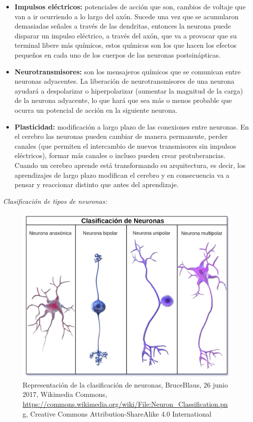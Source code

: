 \begin{itemize}
\item \textbf{Impulsos eléctricos:} potenciales de acción que son, cambios de voltaje que van a ir ocurriendo a lo largo del axón. Sucede una vez que se acumularon demasiadas señales a través de las dendritas, entonces la neurona puede disparar un impulso eléctrico, a través del axón, que va a provocar que su terminal libere más químicos, estos químicos son los que hacen los efectos pequeños en cada uno de los cuerpos de las neuronas postsinápticas.

\item \textbf{Neurotransmisores:} son los mensajeros químicos que se comunican entre neuronas adyacentes. La liberación de neurotransmisores de una neurona ayudará a despolarizar o hiperpolarizar (aumentar la magnitud de la carga) de la neurona adyacente, lo que hará que sea más o menos probable que ocurra un potencial de acción en la siguiente neurona.
 
\item \textbf{Plasticidad:} modificación a largo plazo de las conexiones entre neuronas. En el cerebro las neuronas pueden cambiar de manera permanente, perder canales (que permiten el intercambio de nuevos transmisores sin impulsos eléctricos), formar más canales o incluso pueden crear protuberancias. Cuando un cerebro aprende está transformando su arquitectura, es decir, los aprendizajes de largo plazo modifican el cerebro y en consecuencia va a pensar y reaccionar distinto que antes del aprendizaje.
\end{itemize}




\emph{Clasificación de tipos de neuronas:}


\begin{figure}[h]
 \centering
 \includegraphics[scale=0.15]{../Figuras/tiposDeNeuronas.png}
 \caption{Representación de la clasificación de neuronas, BruceBlaus, 26 junio 2017, Wikimedia Commons, \url{https://commons.wikimedia.org/wiki/File:Neuron_Classification.png}, Creative Commons Attribution-ShareAlike 4.0 International}
 \label{fig:tiposNeuro}
\end{figure}





